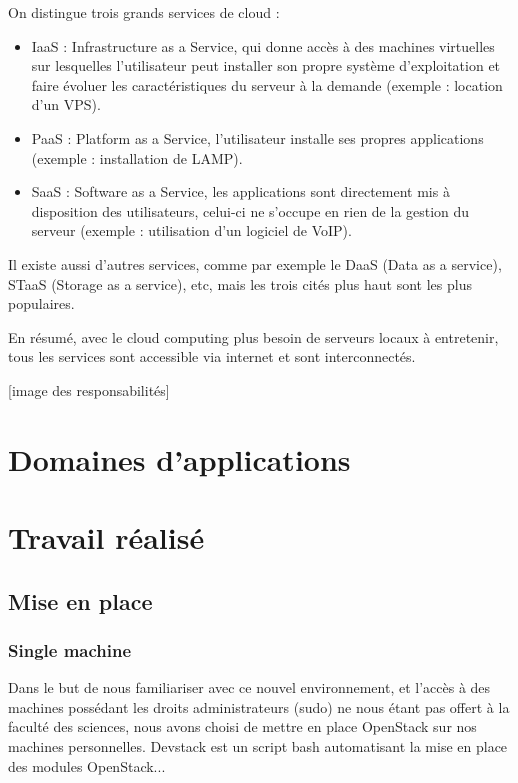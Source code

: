 \documentclass{report}
\begin{document}
    On distingue trois grands services de cloud :
    \begin{itemize}
        \item IaaS : Infrastructure as a Service, qui donne accès à des machines virtuelles sur lesquelles l'utilisateur peut installer son propre système d'exploitation et faire évoluer les caractéristiques du serveur à la demande (exemple : location d'un VPS).
        \item PaaS : Platform as a Service, l'utilisateur installe ses propres applications (exemple : installation de LAMP).
        \item SaaS : Software as a Service, les applications sont directement mis à disposition des utilisateurs, celui-ci ne s'occupe en rien de la gestion du serveur (exemple : utilisation d'un logiciel de VoIP).
    \end{itemize}
    \bigbreak
    
    Il existe aussi d'autres services, comme par exemple le DaaS (Data as a service), STaaS (Storage as a service), etc, mais les trois cités plus haut sont les plus populaires.\break
    
    En résumé, avec le cloud computing plus besoin de serveurs locaux à entretenir, tous les services sont accessible via internet et sont interconnectés.\break
    
    [image des responsabilités]


\newpage
\chapter{Domaines d'applications}


\chapter{Travail réalisé}
    \section{Mise en place}
        \subsection{Single machine}
            Dans le but de nous familiariser avec ce nouvel environnement,
            et l'accès à des machines possédant les droits administrateurs (sudo)
            ne nous étant pas offert à la faculté des sciences,
            nous avons choisi de mettre en place OpenStack sur nos machines personnelles.\break
            Devstack est un script bash automatisant la mise en place des modules OpenStack...
\end{document}
